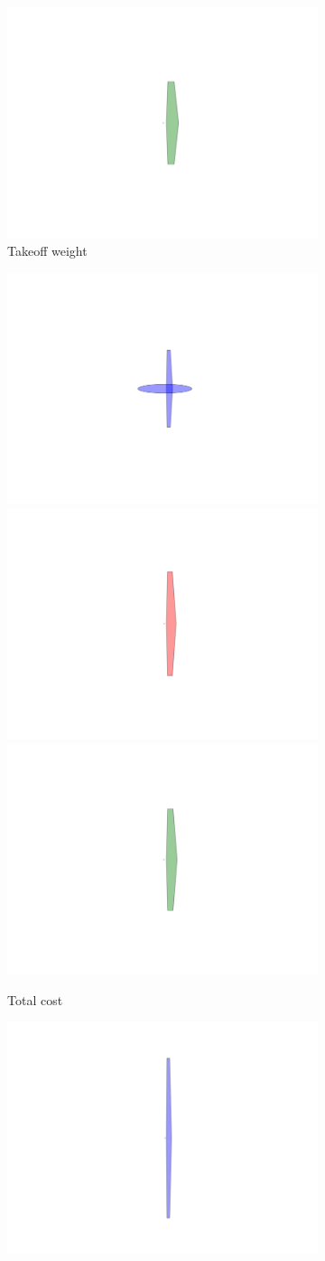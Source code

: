 \begin{figure}
\begin{center}
\begin{subfigure}{0.48\linewidth}
            \includegraphics[trim={8cm 1cm 8cm 1cm}, clip, width=0.33\linewidth]{figures/1box.png}\hfill
            \caption{Takeoff weight}
        \end{subfigure}
        \begin{subfigure}{0.48\linewidth}
            \includegraphics[trim={8cm 1cm 8cm 1cm}, clip, width=0.33\linewidth]{figures/2nominal.png}\hfill
            \includegraphics[trim={8cm 1cm 8cm 1cm}, clip, width=0.33\linewidth]{figures/2elliptical.png}\hfill
            \includegraphics[trim={8cm 1cm 8cm 1cm}, clip, width=0.33\linewidth]{figures/2box.png}\hfill
            \caption{Total cost}
        \end{subfigure}
        \begin{subfigure}{0.48\linewidth}
            \includegraphics[trim={8cm 1cm 8cm 1cm}, clip, width=0.33\linewidth]{figures/3nominal.png}\hfill

\end{subfigure}
\end{center}
\end{figure}
